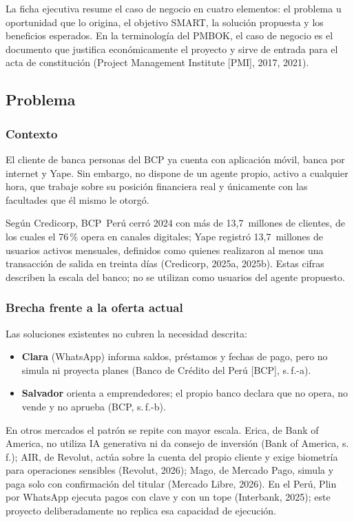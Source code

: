 \documentclass[11pt,a4paper]{article}
\begin{document}
La ficha ejecutiva resume el caso de negocio en cuatro elementos: el problema u oportunidad que lo origina, el objetivo SMART, la solución propuesta y los beneficios esperados. En la terminología del PMBOK, el caso de negocio es el documento que justifica económicamente el proyecto y sirve de entrada para el acta de constitución (Project Management Institute [PMI], 2017, 2021).

\subsection{Problema}\label{sec:problema}

\subsubsection{Contexto}

El cliente de banca personas del BCP ya cuenta con aplicación móvil, banca por internet y Yape. Sin embargo, no dispone de un agente propio, activo a cualquier hora, que trabaje sobre su posición financiera real y únicamente con las facultades que él mismo le otorgó.

Según Credicorp, BCP~Perú cerró 2024 con más de 13,7~millones de clientes, de los cuales el 76\,\% opera en canales digitales; Yape registró 13,7~millones de usuarios activos mensuales, definidos como quienes realizaron al menos una transacción de salida en treinta días (Credicorp, 2025a, 2025b). Estas cifras describen la escala del banco; no se utilizan como usuarios del agente propuesto.

\subsubsection{Brecha frente a la oferta actual}

Las soluciones existentes no cubren la necesidad descrita:

\begin{itemize}
  \item \textbf{Clara} (WhatsApp) informa saldos, préstamos y fechas de pago, pero no simula ni proyecta planes (Banco de Crédito del Perú [BCP], s.\,f.-a).
  \item \textbf{Salvador} orienta a emprendedores; el propio banco declara que no opera, no vende y no aprueba (BCP, s.\,f.-b).
\end{itemize}

En otros mercados el patrón se repite con mayor escala. Erica, de Bank of America, no utiliza IA generativa ni da consejo de inversión (Bank of America, s.\,f.); AIR, de Revolut, actúa sobre la cuenta del propio cliente y exige biometría para operaciones sensibles (Revolut, 2026); Mago, de Mercado Pago, simula y paga solo con confirmación del titular (Mercado Libre, 2026). En el Perú, Plin por WhatsApp ejecuta pagos con clave y con un tope (Interbank, 2025); este proyecto deliberadamente no replica esa capacidad de ejecución.
\end{document}
